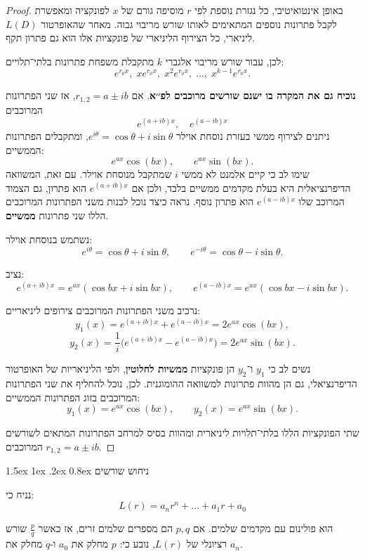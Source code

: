 \documentclass{article}
\makeatletter
\numberwithin{equation}{section}
\renewcommand\paragraph{\@startsection{paragraph}{4}{\z@}%
   {1.5ex \@plus 1ex \@minus .2ex}%
   {0.8ex}%
   {\normalfont\normalsize\bfseries}} %
\makeatother
\begin{document}
\begin{proof}
באופן אינטואיטיבי, כל נגזרת נוספת לפי $r$ מוסיפה גורם של $x$ לפונקציה ומאפשרת לקבל פתרונות נוספים המתאימים לאותו שורש מריבוי גבוה.  
מאחר שהאופרטור $L(D)$ ליניארי, כל הצירוף הליניארי של פונקציות אלו הוא גם פתרון תקף.

לכן, עבור שורש מריבוי אלגברי $k$ מתקבלת משפחת פתרונות בלתי־תלויים:
\[
\boxed{e^{r_0 x},\; x e^{r_0 x},\; x^2 e^{r_0 x},\; \dots,\; x^{k-1} e^{r_0 x}.}
\]

\textbf{
נוכיח גם את המקרה בו ישנם שורשים מרוכבים לפ׳׳א}.  
אם $r_{1,2}=a\pm ib$, אז שני הפתרונות המרוכבים
\[
e^{(a+ib)x}, \quad e^{(a-ib)x}
\]
ניתנים לצירוף ממשי בעזרת נוסחת אוילר $e^{i\theta}=\cos\theta+i\sin\theta$, ומתקבלים הפתרונות הממשיים:
\[
e^{ax}\cos(bx), \qquad e^{ax}\sin(bx).
\]
שימו לב כי קיים אלמנט לא ממשי $i$ שמתקבל מנוסחת אוילר. עם זאת, 
המשוואה הדיפרנציאלית היא בעלת מקדמים ממשיים בלבד, ולכן אם $e^{(a+ib)x}$ הוא פתרון, גם הצמוד המרוכב שלו $e^{(a-ib)x}$ הוא פתרון נוסף.
נראה כיצד נוכל לבנות משני הפתרונות המרוכבים הללו שני פתרונות \textbf{ממשיים}.

נשתמש בנוסחת אוילר:
\[
e^{i\theta} = \cos\theta + i\sin\theta, \qquad e^{-i\theta} = \cos\theta - i\sin\theta.
\]

נציב:
\[
e^{(a+ib)x} = e^{ax}(\cos bx + i\sin bx), \qquad
e^{(a-ib)x} = e^{ax}(\cos bx - i\sin bx).
\]

נרכיב משני הפתרונות המרוכבים צירופים ליניאריים:
\[
y_1(x) = e^{(a+ib)x} + e^{(a-ib)x} = 2 e^{ax}\cos(bx),
\]
\[
y_2(x) = \frac{1}{i}\big(e^{(a+ib)x} - e^{(a-ib)x}\big) = 2 e^{ax}\sin(bx).
\]

נשים לב כי $y_1$ ו־$y_2$ הן פונקציות \textbf{ממשיות לחלוטין}, ולפי הליניאריות של האופרטור הדיפרנציאלי, גם הן מהוות פתרונות למשוואה ההומוגנית.
לכן, נוכל להחליף את שני הפתרונות המרוכבים בזוג הפתרונות הממשיים:
\[
\boxed{
y_1(x) = e^{ax}\cos(bx), \qquad y_2(x) = e^{ax}\sin(bx).
}
\]

שתי הפונקציות הללו בלתי־תלויות ליניארית ומהוות בסיס למרחב הפתרונות המתאים לשורשים המרוכבים $r_{1,2} = a \pm ib$.

\end{proof}


\paragraph{ניחוש שורשים}    

נניח כי:
\[
L(r) = a_n r^n + \dots + a_1 r + a_0
\]

הוא פולינום עם מקדמים שלמים.  
אם $p, q$ הם מספרים שלמים זרים, אז כאשר $\tfrac{p}{q}$ שורש רציונלי של $L(r)$, נובע כי:
$p$
מחלק את $a_{0}$ ו-$q$ מחלק את $a_{n}$.
\end{document}

